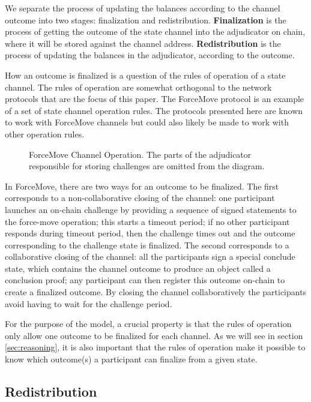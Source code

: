 \documentclass{article}
\begin{document}
We separate the process of updating the balances according to the channel outcome into two stages:
finalization and redistribution.
\textbf{Finalization} is the process of getting the outcome of the state channel into the
adjudicator on chain, where it will be stored against the channel address.
\textbf{Redistribution} is the process of updating the balances in the adjudicator, according
to the outcome.

How an outcome is finalized is a question of the rules of operation of a state channel.
The rules of operation are somewhat orthogonal to the network protocols that are the focus of this paper.
The ForceMove protocol is an example of a set of state channel operation rules.
The protocols presented here are known to work with ForceMove channels but could also likely
be made to work with other operation rules.

\begin{figure}[h]\centering
  

  \caption{
    ForceMove Channel Operation.
    The parts of the adjudicator responsible for storing challenges are omitted from the diagram.
  }\label{fig:modes}
\end{figure}

In ForceMove, there are two ways for an outcome to be finalized.
The first corresponds to a non-collaborative closing of the channel:
one participant launches an on-chain challenge by providing a sequence of signed statements to the force-move operation;
this starts a timeout period;
if no other participant responds during timeout period, then the challenge times out and the outcome
corresponding to the challenge state is finalized.
The second corresponds to a collaborative closing of the channel:
all the participants sign a special conclude state, which contains the channel outcome to
produce an object called a conclusion proof; 
any participant can then register this outcome on-chain to create a finalized outcome.
By closing the channel collaboratively the participants avoid having to wait for the challenge period.

For the purpose of the model, a crucial property is that the rules of operation only allow one outcome to be finalized for each channel.
As we will see in section \ref{sec:reasoning}, it is also important that the rules of operation make it possible to know which outcome(s) a participant can finalize from a given state.

\subsection{Redistribution}
\end{document}
